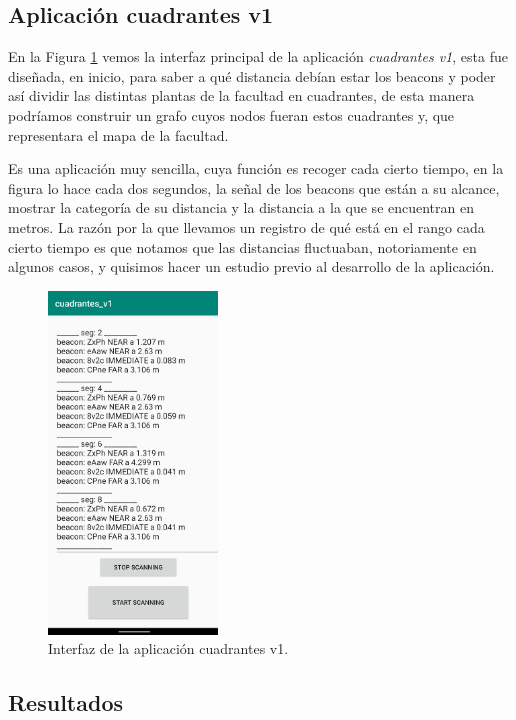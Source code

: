 \subsection{Aplicación cuadrantes v1}
En la Figura \ref{fig:cuadrantesv1} vemos la interfaz principal de la aplicación \textit{cuadrantes v1}, esta fue diseñada, en inicio, para saber a qué distancia debían estar los beacons y poder así dividir las distintas plantas de la facultad en cuadrantes, de esta manera podríamos construir un grafo cuyos nodos fueran estos cuadrantes y, que representara el mapa de la facultad.

Es una aplicación muy sencilla, cuya función es recoger cada cierto tiempo, en la figura lo hace cada dos segundos, la señal de los beacons que están a su alcance, mostrar la categoría de su distancia y la distancia a la que se encuentran en metros. La razón por la que llevamos un registro de qué está en el rango cada cierto tiempo es que notamos que las distancias fluctuaban, notoriamente en algunos casos, y quisimos hacer un estudio previo al desarrollo de la aplicación.

\begin{figure}[t]
	\centering
	\includegraphics[width=0.4\textwidth]{Imagenes/Descripciondeltrabajo/cuadrantes_v1}
	\caption{Interfaz de la aplicación cuadrantes v1.}
	\label{fig:cuadrantesv1}
\end{figure}


\subsection{Resultados}

